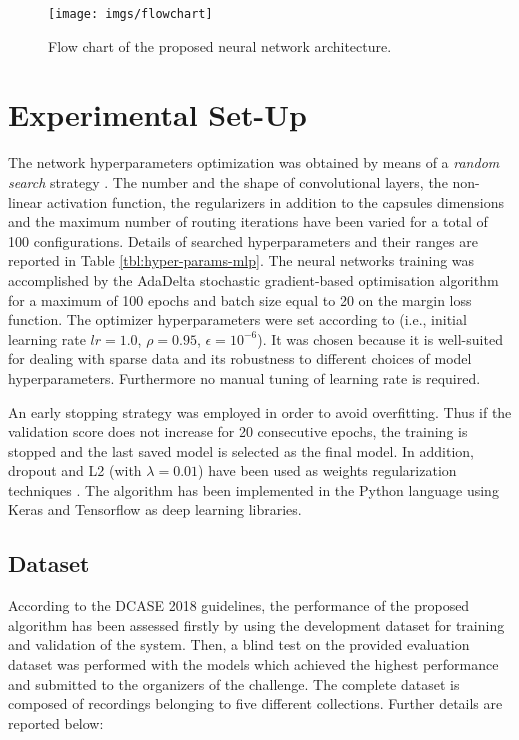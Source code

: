 \begin{figure}[htbp]
	\centering
	\texttt{[image: imgs/flowchart]}
	\label{fig:flowchart}
	\caption{Flow chart of the proposed neural network architecture.}
\end{figure}

\section{Experimental Set-Up}
\label{sec:experiment}

The network hyperparameters optimization was obtained by means of a \textit{random search} strategy  \cite{bergstra2012random}.  The number and the shape of convolutional layers, the non-linear activation function, the regularizers in addition to the capsules dimensions and the maximum number of routing iterations have been varied for a total of 100 configurations. Details of searched hyperparameters and their ranges are reported in Table \ref{tbl:hyper-params-mlp}.
The neural networks training was accomplished by the AdaDelta stochastic gradient-based optimisation algorithm \cite{zeiler2012adadelta} for a maximum of 100 epochs and batch size equal to 20 on the margin loss function. The optimizer hyperparameters were set according to \cite{zeiler2012adadelta} (i.e., initial learning rate $lr=1.0$, $\rho=0.95$, $\epsilon=10^{-6}$). It was chosen because it is well-suited for dealing with sparse data and its robustness to different choices of model hyperparameters. Furthermore no manual tuning of learning rate is required.

An early stopping strategy was employed in order to avoid overfitting. Thus if the validation score does not increase for 20 consecutive epochs, the training is stopped and the last saved model is selected as the final model. In addition, dropout and L2 (with $\lambda=0.01$) have been used as weights regularization techniques \cite{srivastava2014dropout}. 
The algorithm has been implemented in the Python language using Keras \cite{chollet2015keras} and Tensorflow \cite{tensorflow2015-whitepaper} as deep learning libraries.


\subsection{Dataset}
\label{ssec:dataset}
According to the DCASE 2018 guidelines, the performance of the proposed algorithm has been assessed firstly by using the development dataset for training and validation of the system. Then, a blind test on the provided evaluation dataset was performed with the models which achieved the highest performance and submitted to the organizers of the challenge. The complete dataset is composed of recordings belonging to five different collections. Further details are reported below: %

